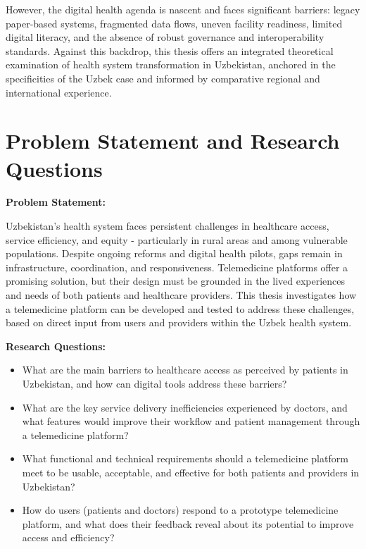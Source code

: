 However, the digital health agenda is nascent and faces significant
barriers: legacy paper-based systems, fragmented data flows, uneven
facility readiness, limited digital literacy, and the absence of robust
governance and interoperability standards. Against this backdrop, this
thesis offers an integrated theoretical examination of health system
transformation in Uzbekistan, anchored in the specificities of the Uzbek
case and informed by comparative regional and international experience.

\section{\texorpdfstring{\textbf{Problem Statement and Research
Questions}}{Problem Statement and Research Questions}}\label{problem-statement-and-research-questions}

\textbf{Problem Statement:}

Uzbekistan's health system faces persistent challenges in healthcare
access, service efficiency, and equity - particularly in rural areas and
among vulnerable populations. Despite ongoing reforms and digital health
pilots, gaps remain in infrastructure, coordination, and responsiveness.
Telemedicine platforms offer a promising solution, but their design must
be grounded in the lived experiences and needs of both patients and
healthcare providers. This thesis investigates how a telemedicine
platform can be developed and tested to address these challenges, based
on direct input from users and providers within the Uzbek health system.

\textbf{Research Questions:}

\begin{itemize}
\item
  What are the main barriers to healthcare access as perceived by
  patients in Uzbekistan, and how can digital tools address these
  barriers?
\item
  What are the key service delivery inefficiencies experienced by
  doctors, and what features would improve their workflow and patient
  management through a telemedicine platform?
\item
  What functional and technical requirements should a telemedicine
  platform meet to be usable, acceptable, and effective for both
  patients and providers in Uzbekistan?
\item
  How do users (patients and doctors) respond to a prototype
  telemedicine platform, and what does their feedback reveal about its
  potential to improve access and efficiency?
\end{itemize}


